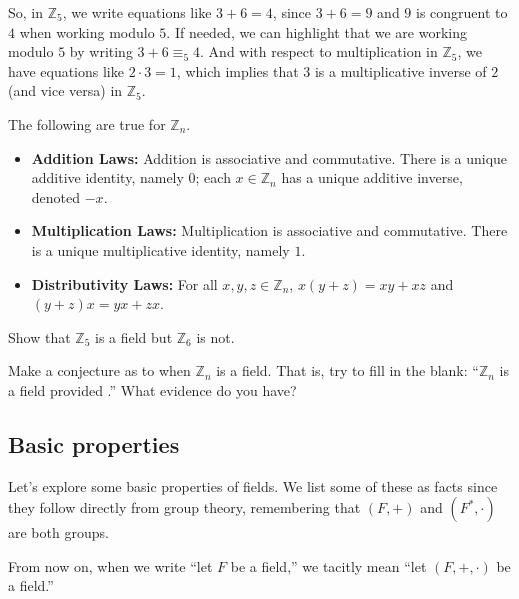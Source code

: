 So, in $\mathbb{Z}_5$, we write equations like $3+6 = 4$, since $3+6 = 9$ and $9$ is congruent to $4$ when working modulo $5$. If needed, we can highlight that we are working modulo $5$ by writing  $3+6 \equiv_5 4$. And with respect to multiplication in $\mathbb{Z}_5$, we have equations like $2\cdot3 = 1$, which implies that $3$ is a multiplicative inverse of $2$ (and vice versa) in $\mathbb{Z}_5$.

\begin{fact}\label{fact.IntegersModnLaws} The following are true for $\mathbb{Z}_n$.
\begin{itemize}
\item \textbf{Addition Laws:} Addition is associative and commutative. There is a unique additive identity, namely $0$; each $x\in\mathbb{Z}_n$ has a unique additive inverse, denoted $-x$.
\item \textbf{Multiplication Laws:} Multiplication is associative and commutative. There is a unique multiplicative identity, namely $1$.
\item \textbf{Distributivity Laws:} For all $x,y,z \in \mathbb{Z}_n$, $x(y+z) = xy+xz$ and $(y+z)x = yx+zx$.
\end{itemize}
\end{fact}

\begin{problem}
Show that $\mathbb{Z}_5$ is a field but $\mathbb{Z}_6$ is not.
\end{problem}

\begin{problem}\label{prob.ConjectureZn}
Make a conjecture as to when $\mathbb{Z}_n$ is a field. That is, try to fill in the blank: ``$\mathbb{Z}_n$ is a field provided .'' What evidence do you have?
\end{problem}

\subsection{Basic properties}

Let's explore some basic properties of fields. We list some of these as facts since they follow directly from group theory, remembering that $(F,+)$ and $(F^*,\cdot)$ are both groups. 

From now on, when we write ``let $F$ be a field,'' we tacitly mean ``let $(F,+,\cdot)$ be a field.''

